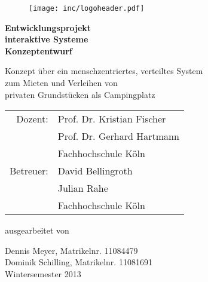 
\begin{titlepage}

\begin{center}

\begin{figure}[!ht]
	\centering
		\texttt{[image: inc/logoheader.pdf]}
\end{figure}

\vspace{4.0cm}

\begin{Huge}
	\textbf{Entwicklungsprojekt }\\
	\vspace{0.1cm}
	\textbf{interaktive Systeme}\\
	\vspace{0.1cm}
	\textbf{Konzeptentwurf}\\

\end{Huge}

\vspace{0.8cm}

\begin{LARGE}
	Konzept über ein menschzentriertes, verteiltes System\\
	\vspace{0.1cm}
	zum Mieten und Verleihen von \\
	\vspace{0.1cm}
	privaten Grundstücken als Campingplatz\\
\end{LARGE}

\vspace{2cm}

\begin{tabular}{rl}
        Dozent:  &  Prof. Dr. Kristian Fischer\\
       		 	 &  Prof. Dr. Gerhard Hartmann\\
       			 &  \small Fachhochschule Köln \\[1.0em]
      Betreuer:  &  David Bellingroth\\
				 &  Julian Rahe\\
       			 &  \small Fachhochschule Köln\\
\end{tabular}

\vspace{1.6cm}

\begin{large}
	ausgearbeitet von\\
	\vspace{0.2cm}
\end{large}

\begin{Large}
	Dennis Meyer, Matrikelnr. 11084479\\
	Dominik Schilling, Matrikelnr. 11081691\\
	\vspace{1cm}
	Wintersemester 2013
\end{Large}

\end{center}

\end{titlepage}
